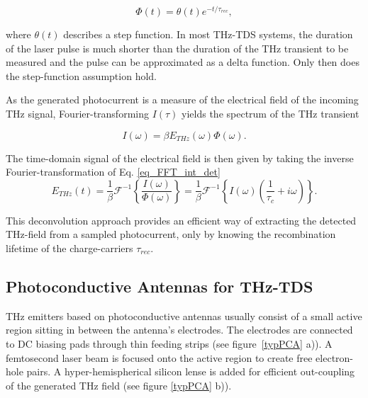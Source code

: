 \begin{equation}
	\Phi(t) = \theta(t)e^{-t/\tau_{rec}},
\end{equation}

where $\theta(t)$ describes a step function. In most THz-TDS systems, the duration of the laser pulse is much shorter than the duration of the THz transient to be measured and the pulse can be approximated as a delta function. Only then does the step-function assumption hold. 

As the generated photocurrent is a measure of the electrical field of the incoming THz signal, Fourier-transforming $I(\tau)$ yields the spectrum of the THz transient

\begin{equation}
	I(\omega) = \beta E_{THz}(\omega) \Phi(\omega). 
	\label{eq_FFT_int_det}
\end{equation}

The time-domain signal of the electrical field is then given by taking the inverse Fourier-transformation of Eq. \ref{eq_FFT_int_det}
\begin{equation}
	E_{THz}(t) = \frac{1}{\beta} \mathcal{F}^{-1}\left\{\frac{I(\omega)}{\Phi(\omega)} \right\} =  \frac{1}{\beta} \mathcal{F}^{-1} \left\{I(\omega)(\frac{1}{\tau_c} + i \omega)
	 \right\}.
\end{equation}

This deconvolution approach provides an efficient way of extracting the detected THz-field from a sampled photocurrent, only by knowing the recombination lifetime of the charge-carriers $\tau_{rec}$. 
\subsection{Photoconductive Antennas for THz-TDS}
THz emitters based on photoconductive antennas usually consist of a small active region sitting in between the antenna's electrodes. The electrodes are connected to DC biasing pads through thin feeding strips (see figure~\ref{typPCA} a)). A femtosecond laser beam is focused onto the active region to create free electron-hole pairs. A hyper-hemispherical silicon lense is added for efficient out-coupling of the generated THz field (see figure \ref{typPCA} b)). 

